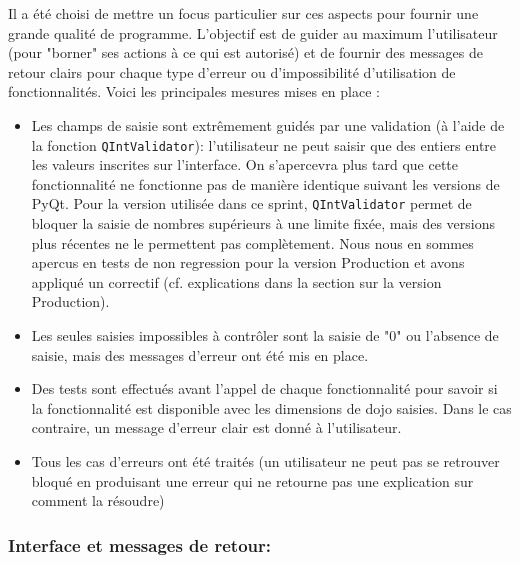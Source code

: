 \begin{enumerate}
          Il a été choisi de mettre un focus particulier sur ces aspects pour fournir une grande qualité de programme.
          L’objectif est de guider au maximum l’utilisateur (pour "borner" ses actions à ce qui est autorisé) et
          de fournir des messages de retour clairs pour chaque type d’erreur ou d'impossibilité d’utilisation de fonctionnalités.
          Voici les principales mesures mises en place :
          \begin{itemize}
              \item Les champs de saisie sont extrêmement guidés par une validation (à l'aide de la fonction \texttt{QIntValidator}):
                    l’utilisateur ne peut saisir que des entiers entre les valeurs inscrites sur l’interface.
                    On s'apercevra plus tard que cette fonctionnalité ne fonctionne pas de manière identique suivant les versions 
                    de PyQt. Pour la version utilisée dans ce sprint, \texttt{QIntValidator} permet de bloquer la saisie de 
                    nombres supérieurs à une limite fixée, mais des versions plus récentes ne le permettent pas complètement. 
                    Nous nous en sommes apercus en tests de non regression pour la version Production et avons appliqué un correctif 
                    (cf. explications dans la section sur la version Production).
              \item Les seules saisies impossibles à contrôler sont la saisie de "0" ou l’absence de saisie, mais des messages d’erreur
                    ont été mis en place.
              \item Des tests sont effectués avant l’appel de chaque fonctionnalité pour savoir si la fonctionnalité est disponible avec
                    les dimensions de dojo saisies. Dans le cas contraire, un message d’erreur clair est donné à l'utilisateur.
              \item Tous les cas d’erreurs ont été traités (un utilisateur ne peut pas se retrouver bloqué en produisant une erreur
                    qui ne retourne pas une explication sur comment la résoudre)
          \end{itemize}

\end{enumerate}


\subsubsection*{Interface et messages de retour:}


